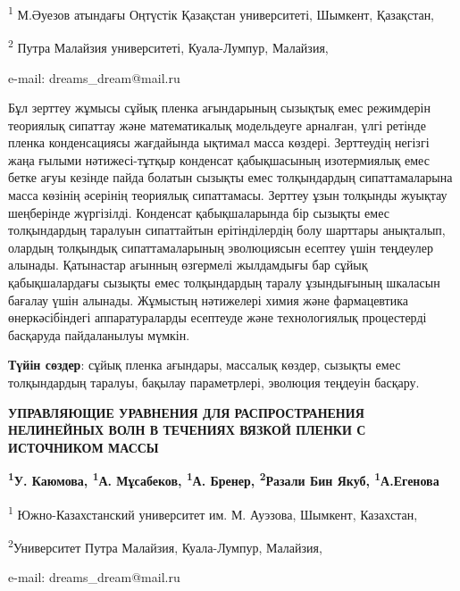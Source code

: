 \begin{affiliation}
\textsuperscript{1} М.Әуезов атындағы Оңтүстік Қазақстан университеті, Шымкент, Қазақстан,

\textsuperscript{2} Путра Малайзия университеті, Куала-Лумпур, Малайзия,

e-mail: dreams\_dream@mail.ru
\end{affiliation}

Бұл зерттеу жұмысы сұйық пленка ағындарының сызықтық емес режимдерін
теориялық сипаттау және математикалық модельдеуге арналған, үлгі ретінде
пленка конденсациясы жағдайында ықтимал масса көздері. Зерттеудің
негізгі жаңа ғылыми нәтижесі-тұтқыр конденсат қабықшасының изотермиялық
емес бетке ағуы кезінде пайда болатын сызықты емес толқындардың
сипаттамаларына масса көзінің әсерінің теориялық сипаттамасы. Зерттеу
ұзын толқынды жуықтау шеңберінде жүргізілді. Конденсат қабықшаларында
бір сызықты емес толқындардың таралуын сипаттайтын ерітінділердің болу
шарттары анықталып, олардың толқындық сипаттамаларының эволюциясын
есептеу үшін теңдеулер алынады. Қатынастар ағынның өзгермелі жылдамдығы
бар сұйық қабықшалардағы сызықты емес толқындардың таралу ұзындығының
шкаласын бағалау үшін алынады. Жұмыстың нәтижелері химия және
фармацевтика өнеркәсібіндегі аппаратураларды есептеуде және
технологиялық процестерді басқаруда пайдаланылуы мүмкін.

{\bfseries Түйін сөздер}: сұйық пленка ағындары, массалық көздер, сызықты
емес толқындардың таралуы, бақылау параметрлері, эволюция теңдеуін
басқару.

\begin{articleheader}
{\bfseries УПРАВЛЯЮЩИЕ УРАВНЕНИЯ ДЛЯ РАСПРОСТРАНЕНИЯ НЕЛИНЕЙНЫХ ВОЛН В
ТЕЧЕНИЯХ ВЯЗКОЙ ПЛЕНКИ С ИСТОЧНИКОМ МАССЫ}

{\bfseries \textsuperscript{1}У. Каюмова\textsuperscript{\envelope },
\textsuperscript{1}А. Мұсабеков, \textsuperscript{1}А. Бренер,
\textsuperscript{2}Разали Бин Якуб, \textsuperscript{1}А.Егенова}
\end{articleheader}

\begin{affiliation}
\textsuperscript{1} Южно-Казахстанский университет им. М. Ауэзова, Шымкент, Казахстан,

\textsuperscript{2}Университет Путра Малайзия, Куала-Лумпур, Малайзия,

e-mail: dreams\_dream@mail.ru
\end{affiliation}


